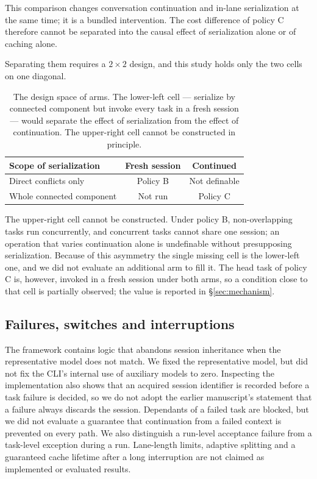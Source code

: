 \documentclass[a4paper,11pt]{article}
\begin{document}
This comparison changes conversation continuation and in-lane serialization at the same time; it is a bundled intervention. The cost difference of policy C therefore cannot be separated into the causal effect of serialization alone or of caching alone.

Separating them requires a $2\times2$ design, and this study holds only the two cells on one diagonal.

\begin{table}[!htbp]
\centering\small
\begin{tabular}{lcc}
\toprule Scope of serialization & Fresh session & Continued\\\midrule
Direct conflicts only & Policy B & Not definable\\
Whole connected component & Not run & Policy C\\
\bottomrule
\end{tabular}
\caption{The design space of arms. The lower-left cell --- serialize by connected component but invoke every task in a fresh session --- would separate the effect of serialization from the effect of continuation. The upper-right cell cannot be constructed in principle.}
\label{tab:design}
\end{table}

The upper-right cell cannot be constructed. Under policy B, non-overlapping tasks run concurrently, and concurrent tasks cannot share one session; an operation that varies continuation alone is undefinable without presupposing serialization. Because of this asymmetry the single missing cell is the lower-left one, and we did not evaluate an additional arm to fill it. The head task of policy C is, however, invoked in a fresh session under both arms, so a condition close to that cell is partially observed; the value is reported in \S\ref{sec:mechanism}.

\subsection{Failures, switches and interruptions}
The framework contains logic that abandons session inheritance when the representative model does not match. We fixed the representative model, but did not fix the CLI's internal use of auxiliary models to zero. Inspecting the implementation also shows that an acquired session identifier is recorded before a task failure is decided, so we do not adopt the earlier manuscript's statement that a failure always discards the session. Dependants of a failed task are blocked, but we did not evaluate a guarantee that continuation from a failed context is prevented on every path. We also distinguish a run-level acceptance failure from a task-level exception during a run. Lane-length limits, adaptive splitting and a guaranteed cache lifetime after a long interruption are not claimed as implemented or evaluated results.
\end{document}
